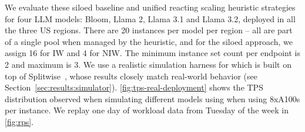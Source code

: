 
We evaluate these siloed baseline and unified reacting scaling  heuristic strategies for four LLM models: Bloom, Llama 2, Llama 3.1 and Llama 3.2, deployed in all the three US regions. There are 20 instances per model per region -- all are part of a single pool when managed by the heuristic, and for the siloed approach, we assign 16 for IW and 4 for NIW. The minimum instance set count per endpoint is 2 and maximum is 3. 
We use a realistic simulation harness for \sys which is built on top of Splitwise~\cite{splitwise}, whose results closely match real-world behavior (see Section~\ref{sec:results:simulator}). \autoref{fig:tps-real-deployment} shows the TPS distribution observed when simulating different models using \sys when using 8xA100s per instance. 
We replay one day of workload data from Tuesday of the week in \autoref{fig:rps}. 



